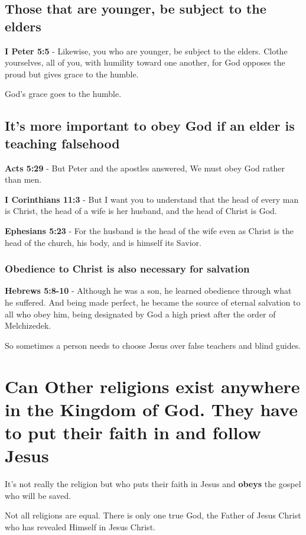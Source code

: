 \documentclass[11pt]{article}
\begin{document}
\subsection{Those that are younger, be subject to the elders}
\label{sec:org25b59a0}
\textbf{I Peter 5:5} - Likewise, you who are younger, be subject to the elders. Clothe yourselves, all of you, with humility toward one another, for God opposes the proud but gives grace to the humble.

God's grace goes to the humble.

\subsection{It's more important to obey God if an elder is teaching falsehood}
\label{sec:org379868f}
\textbf{Acts 5:29} - But Peter and the apostles answered, We must obey God rather than men.

\textbf{I Corinthians 11:3} - But I want you to understand that the head of every man is Christ, the head of a wife is her husband, and the head of Christ is God.

\textbf{Ephesians 5:23} - For the husband is the head of the wife even as Christ is the head of the church, his body, and is himself its Savior.

\subsubsection{Obedience to Christ is also necessary for salvation}
\label{sec:orgd268ba2}
\textbf{Hebrews 5:8-10} - Although he was a son, he learned obedience through what he suffered. And being made perfect, he became the source of eternal salvation to all who obey him, being designated by God a high priest after the order of Melchizedek.

So sometimes a person needs to choose Jesus over false teachers and blind guides.

\section{Can Other religions exist anywhere in the Kingdom of God. They have to put their faith in and follow Jesus}
\label{sec:org7660742}
It's not really the religion but who puts their faith in Jesus and \textbf{obeys} the gospel who will be saved.

Not all religions are equal.
There is only one true God, the Father of Jesus Christ who has revealed Himself in Jesus Christ.
\end{document}
